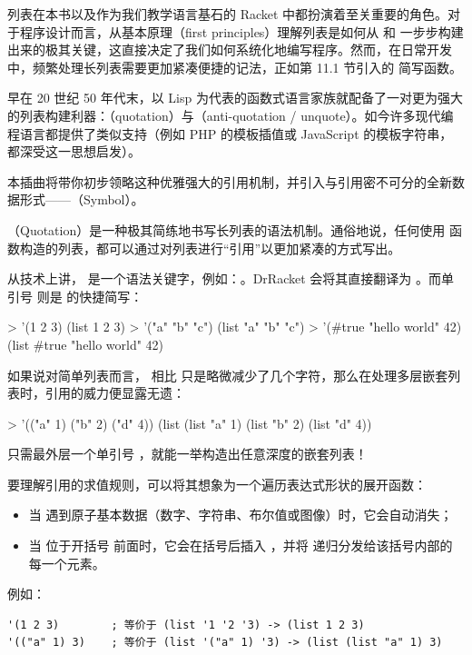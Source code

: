 
\label{sec:intermezzo02}

列表在本书以及作为我们教学语言基石的 Racket 中都扮演着至关重要的角色。对于程序设计而言，从基本原理（first principles）理解列表是如何从  和  一步步构建出来的极其关键，这直接决定了我们如何系统化地编写程序。然而，在日常开发中，频繁处理长列表需要更加紧凑便捷的记法，正如第 11.1 节引入的  简写函数。

早在 20 世纪 50 年代末，以 Lisp 为代表的函数式语言家族就配备了一对更为强大的列表构建利器：（quotation）与（anti-quotation / unquote）。如今许多现代编程语言都提供了类似支持（例如 PHP 的模板插值或 JavaScript 的模板字符串，都深受这一思想启发）。

本插曲将带你初步领略这种优雅强大的引用机制，并引入与引用密不可分的全新数据形式——（Symbol）。


（Quotation）是一种极其简练地书写长列表的语法机制。通俗地说，任何使用  函数构造的列表，都可以通过对列表进行“引用”以更加紧凑的方式写出。

从技术上讲， 是一个语法关键字，例如：。DrRacket 会将其直接翻译为 。而单引号  则是  的快捷简写：
\begin{replbox}
> '(1 2 3)
(list 1 2 3)
> '("a" "b" "c")
(list "a" "b" "c")
> '(#true "hello world" 42)
(list #true "hello world" 42)
\end{replbox}

如果说对简单列表而言， 相比  只是略微减少了几个字符，那么在处理多层嵌套列表时，引用的威力便显露无遗：
\begin{replbox}
> '(("a" 1)
    ("b" 2)
    ("d" 4))
(list (list "a" 1) (list "b" 2) (list "d" 4))
\end{replbox}
只需最外层一个单引号 ，就能一举构造出任意深度的嵌套列表！

要理解引用的求值规则，可以将其想象为一个遍历表达式形状的展开函数：
\begin{itemize}
  \item 当  遇到原子基本数据（数字、字符串、布尔值或图像）时，它会自动消失；
  \item 当  位于开括号 \code{(} 前面时，它会在括号后插入 ，并将  递归分发给该括号内部的每一个元素。
\end{itemize}
例如：
\begin{lstlisting}[language=BSL]
'(1 2 3)        ; 等价于 (list '1 '2 '3) -> (list 1 2 3)
'(("a" 1) 3)    ; 等价于 (list '("a" 1) '3) -> (list (list "a" 1) 3)
\end{lstlisting}

